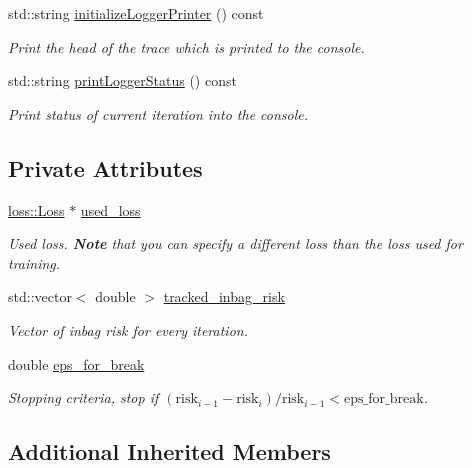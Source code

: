 \begin{DoxyCompactItemize}
std\+::string \mbox{\hyperlink{classlogger_1_1_logger_inbag_risk_a17caab25f28cc05d9170c8ac2d910487}{initialize\+Logger\+Printer}} () const
\begin{DoxyCompactList}\small\item\em Print the head of the trace which is printed to the console. \end{DoxyCompactList}\item 
std\+::string \mbox{\hyperlink{classlogger_1_1_logger_inbag_risk_a3b7e827e941f2cb4b9def7296a5db38f}{print\+Logger\+Status}} () const
\begin{DoxyCompactList}\small\item\em Print status of current iteration into the console. \end{DoxyCompactList}\end{DoxyCompactItemize}
\subsection*{Private Attributes}
\begin{DoxyCompactItemize}
\item 
\mbox{\hyperlink{classloss_1_1_loss}{loss\+::\+Loss}} $\ast$ \mbox{\hyperlink{classlogger_1_1_logger_inbag_risk_abd70a6ddb6701bab59cd3ac01468938b}{used\+\_\+loss}}
\begin{DoxyCompactList}\small\item\em Used loss. {\bfseries Note} that you can specify a different loss than the loss used for training. \end{DoxyCompactList}\item 
std\+::vector$<$ double $>$ \mbox{\hyperlink{classlogger_1_1_logger_inbag_risk_a823c1a3de2cc47d8fca047297d374590}{tracked\+\_\+inbag\+\_\+risk}}
\begin{DoxyCompactList}\small\item\em Vector of inbag risk for every iteration. \end{DoxyCompactList}\item 
double \mbox{\hyperlink{classlogger_1_1_logger_inbag_risk_a2990493d573d8e57605e4d96e0c0d8bb}{eps\+\_\+for\+\_\+break}}
\begin{DoxyCompactList}\small\item\em Stopping criteria, stop if $(\mathrm{risk}_{i-1} - \mathrm{risk}_i) / \mathrm{risk}_{i-1} < \mathrm{eps\_for\_break}$. \end{DoxyCompactList}\end{DoxyCompactItemize}
\subsection*{Additional Inherited Members}


